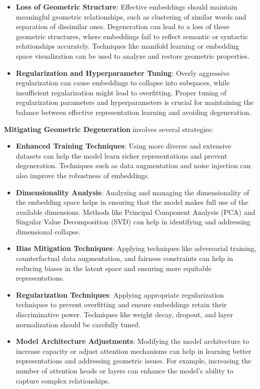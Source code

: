 \begin{itemize}
    \item \textbf{Loss of Geometric Structure}: Effective embeddings should maintain meaningful geometric relationships, such as clustering of similar words and separation of dissimilar ones. Degeneration can lead to a loss of these geometric structures, where embeddings fail to reflect semantic or syntactic relationships accurately. Techniques like manifold learning or embedding space visualization can be used to analyze and restore geometric properties.

    \item \textbf{Regularization and Hyperparameter Tuning}: Overly aggressive regularization can cause embeddings to collapse into subspaces, while insufficient regularization might lead to overfitting. Proper tuning of regularization parameters and hyperparameters is crucial for maintaining the balance between effective representation learning and avoiding degeneration.

\end{itemize}

\textbf{Mitigating Geometric Degeneration} involves several strategies:
\begin{itemize}
    \item \textbf{Enhanced Training Techniques}: Using more diverse and extensive datasets can help the model learn richer representations and prevent degeneration. Techniques such as data augmentation and noise injection can also improve the robustness of embeddings.
    
    \item \textbf{Dimensionality Analysis}: Analyzing and managing the dimensionality of the embedding space helps in ensuring that the model makes full use of the available dimensions. Methods like Principal Component Analysis (PCA) and Singular Value Decomposition (SVD) can help in identifying and addressing dimensional collapse.

    \item \textbf{Bias Mitigation Techniques}: Applying techniques like adversarial training, counterfactual data augmentation, and fairness constraints can help in reducing biases in the latent space and ensuring more equitable representations.

    \item \textbf{Regularization Techniques}: Applying appropriate regularization techniques to prevent overfitting and ensure embeddings retain their discriminative power. Techniques like weight decay, dropout, and layer normalization should be carefully tuned.

    \item \textbf{Model Architecture Adjustments}: Modifying the model architecture to increase capacity or adjust attention mechanisms can help in learning better representations and addressing geometric issues. For example, increasing the number of attention heads or layers can enhance the model’s ability to capture complex relationships.
\end{itemize}

